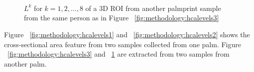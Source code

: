 \begin{figure}[htb]
\centering
{}\hspace{0.15\linewidth}
\\
\hspace{0.15\linewidth}
\\
\hspace{0.15\linewidth}
\\
\hspace{0.15\linewidth}
\caption[Different cross-section area $L^k$ for $k=1,2,\dots,8$]{$L^k$ for $k=1,2,\dots,8$ of a 3D ROI from another palmprint sample from the same person as in Figure ~\ref{fig:methodology:hcalevels3}}
\label{fig:methodology:hcalevels4}
\end{figure}

Figure ~\ref{fig:methodology:hcalevels1} and ~\ref{fig:methodology:hcalevels2} shows the cross-sectional area feature from two samples collected from one palm. Figure ~\ref{fig:methodology:hcalevels3} and ~\ref{fig:methodology:hcalevels4} are extracted from two samples from another palm.
